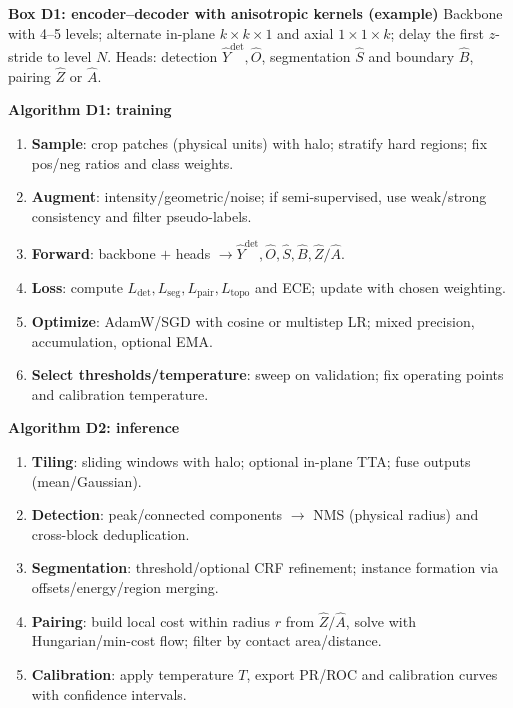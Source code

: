 \medskip
\noindent\textbf{Box D1: encoder--decoder with anisotropic kernels (example)}\;
Backbone with 4--5 levels; alternate in-plane \(k\times k\times 1\) and axial \(1\times 1\times k\); delay the first \(z\)-stride to level \(N\).
Heads: detection \(\hat{Y}^{\text{det}},\hat{O}\), segmentation \(\hat{S}\) and boundary \(\hat{B}\), pairing \(\hat{Z}\) or \(\hat{A}\).\par

\medskip
\noindent\textbf{Algorithm D1: training}\;
\begin{enumerate}
  \item \textbf{Sample}: crop patches (physical units) with halo; stratify hard regions; fix pos/neg ratios and class weights.
  \item \textbf{Augment}: intensity/geometric/noise; if semi-supervised, use weak/strong consistency and filter pseudo-labels.
  \item \textbf{Forward}: backbone \(+\) heads \(\rightarrow \hat{Y}^{\text{det}},\hat{O},\hat{S},\hat{B},\hat{Z}/\hat{A}\).
  \item \textbf{Loss}: compute \(L_{\text{det}},L_{\text{seg}},L_{\text{pair}},L_{\text{topo}}\) and ECE; update with chosen weighting.
  \item \textbf{Optimize}: AdamW/SGD with cosine or multistep LR; mixed precision, accumulation, optional EMA.
  \item \textbf{Select thresholds/temperature}: sweep on validation; fix operating points and calibration temperature.
\end{enumerate}

\noindent\textbf{Algorithm D2: inference}\;
\begin{enumerate}
  \item \textbf{Tiling}: sliding windows with halo; optional in-plane TTA; fuse outputs (mean/Gaussian).
  \item \textbf{Detection}: peak/connected components \(\rightarrow\) NMS (physical radius) and cross-block deduplication.
  \item \textbf{Segmentation}: threshold/optional CRF refinement; instance formation via offsets/energy/region merging.
  \item \textbf{Pairing}: build local cost within radius \(r\) from \(\hat{Z}/\hat{A}\), solve with Hungarian/min-cost flow; filter by contact area/distance.
  \item \textbf{Calibration}: apply temperature \(T\), export PR/ROC and calibration curves with confidence intervals.
\end{enumerate}

